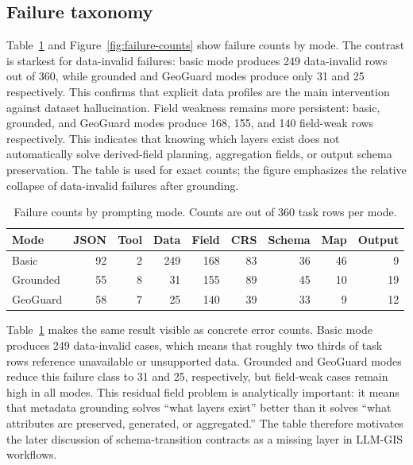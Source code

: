 \documentclass[]{interact}
\begin{document}
\subsection{Failure taxonomy}

Table~\ref{tab:failure-summary} and Figure~\ref{fig:failure-counts} show failure counts by mode. The contrast is starkest for data-invalid failures: basic mode produces 249 data-invalid rows out of 360, while grounded and GeoGuard modes produce only 31 and 25 respectively. This confirms that explicit data profiles are the main intervention against dataset hallucination. Field weakness remains more persistent: basic, grounded, and GeoGuard modes produce 168, 155, and 140 field-weak rows respectively. This indicates that knowing which layers exist does not automatically solve derived-field planning, aggregation fields, or output schema preservation. The table is used for exact counts; the figure emphasizes the relative collapse of data-invalid failures after grounding.

\begin{table}[htbp]
\centering
\caption{Failure counts by prompting mode. Counts are out of 360 task rows per mode.}
\label{tab:failure-summary}
\small
\setlength{\tabcolsep}{4pt}
\begin{tabular}{lrrrrrrrr}
\toprule
Mode & JSON & Tool & Data & Field & CRS & Schema & Map & Output \\
\midrule
Basic & 92 & 2 & 249 & 168 & 83 & 36 & 46 & 9 \\
Grounded & 55 & 8 & 31 & 155 & 89 & 45 & 10 & 19 \\
GeoGuard & 58 & 7 & 25 & 140 & 39 & 33 & 9 & 12 \\
\bottomrule
\end{tabular}
\end{table}

Table~\ref{tab:failure-summary} makes the same result visible as concrete error counts. Basic mode produces 249 data-invalid cases, which means that roughly two thirds of task rows reference unavailable or unsupported data. Grounded and GeoGuard modes reduce this failure class to 31 and 25, respectively, but field-weak cases remain high in all modes. This residual field problem is analytically important: it means that metadata grounding solves ``what layers exist'' better than it solves ``what attributes are preserved, generated, or aggregated.'' The table therefore motivates the later discussion of schema-transition contracts as a missing layer in LLM-GIS workflows.
\end{document}
